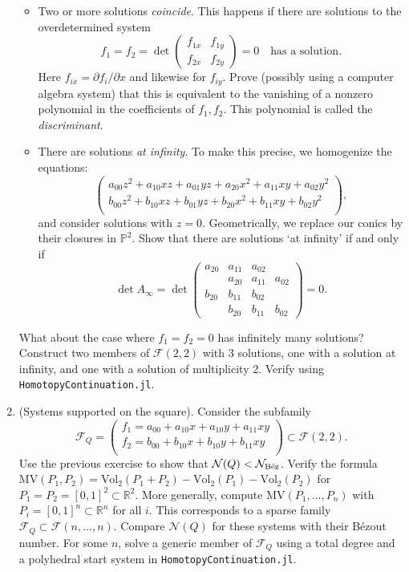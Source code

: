 \documentclass[11pt,reqno]{amsart}
\theoremstyle{definition}
\theoremstyle{remark}
\numberwithin{equation}{section}
\begin{document}
\begin{enumerate}
\begin{itemize}
\item Two or more solutions \emph{coincide}. This happens if there are solutions to the overdetermined system
$$ f_1 = f_2 = \det \begin{pmatrix} f_{1x} & f_{1y} \\ f_{2x} & f_{2y} \end{pmatrix} = 0 \quad \text{has a solution}.$$
Here $f_{ix} = \partial f_i / \partial x$ and likewise for $f_{iy}$. Prove (possibly using a computer algebra system) that this is equivalent to the vanishing of a nonzero polynomial in the coefficients of $f_1, f_2$. This polynomial is called the \emph{discriminant}.
\item There are solutions \emph{at infinity}. To make this precise, we homogenize the equations:
$$\begin{pmatrix}
a_{00} z^2+ a_{10} x z+ a_{01} yz + a_{20}x^2 + a_{11}xy + a_{02} y^2 \\
b_{00} z^2 + b_{10} x z + b_{01} yz + b_{20}x^2 + b_{11}xy + b_{02} y^2 \\
\end{pmatrix},$$
and consider solutions with $z = 0$. Geometrically, we replace our conics by their closures in $\mathbb{P}^2$. Show that there are solutions `at infinity' if and only if
$$ \det A_\infty = \det \begin{pmatrix} a_{20} & a_{11} & a_{02} & \\ & a_{20} & a_{11} & a_{02} \\ b_{20} & b_{11} & b_{02} & \\ & b_{20} & b_{11} & b_{02} \end{pmatrix} = 0.$$
\end{itemize}
What about the case where $f_1 = f_2 = 0$ has infinitely many solutions? \\

Construct two members of $\mathcal{F}(2,2)$ with 3 solutions, one with a solution at infinity, and one with a solution of multiplicity 2. Verify using \texttt{HomotopyContinuation.jl}.

\item (Systems supported on the square).
Consider the subfamily
$$ \mathcal{F}_Q = \begin{pmatrix}
f_1 = a_{00} + a_{10}x + a_{10}y + a_{11}xy \\
f_2 = b_{00} + b_{10}x + b_{10}y + b_{11}xy \\
\end{pmatrix} \subset \mathcal{F}(2,2).$$
Use the previous exercise to show that $\mathcal{N}(Q) < \mathcal{N}_{\textup{B\'ez}}$. Verify the formula $\text{MV}(P_1,P_2) = \text{Vol}_2(P_1 + P_2) - \text{Vol}_2(P_1) - \text{Vol}_2(P_2)$ for $P_1 = P_2 = [0,1]^2 \subset \mathbb{R}^2$. More generally, compute $\text{MV}(P_1, \ldots, P_n)$ with $P_i = [0,1]^n \subset \mathbb{R}^n$ for all $i$. This corresponds to a sparse family $\mathcal{F}_Q \subset \mathcal{F}(n,\ldots, n)$. Compare $\mathcal{N}(Q)$ for these systems with their B\'ezout number. For some $n$, solve a generic member of $\mathcal{F}_Q$ using a total degree and a polyhedral start system in \texttt{HomotopyContinuation.jl}.


\end{enumerate}
\end{document}
